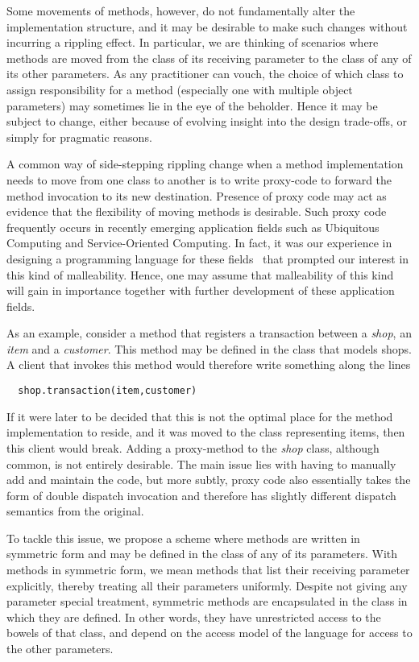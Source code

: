 \documentclass[11pt]{article}
\begin{document}
Some movements of methods, however, do not fundamentally alter the implementation structure, and it may be desirable to make such changes without incurring a rippling effect. In particular, we are thinking of scenarios where methods are moved from the class of its receiving parameter to the class of any of its other parameters. As any practitioner can vouch, the choice of which class to assign responsibility for a method (especially one with multiple object parameters) may sometimes lie in the eye of the beholder. Hence it may be subject to change, either because of evolving insight into the design trade-offs, or simply for pragmatic reasons. 

A common way of side-stepping rippling change when a method implementation needs to move from one class to another is to write proxy-code to forward the method invocation to its new destination. Presence of proxy code may act as evidence that the flexibility of moving methods is desirable. Such proxy code frequently occurs in recently emerging application fields such as Ubiquitous Computing and Service-Oriented Computing. In fact, it was our experience in designing a programming language for these fields~\cite{continuum} that prompted our interest in this kind of malleability. Hence, one may assume that malleability of this kind will gain in importance together with further development of these application fields.

As an example, consider a method that registers a transaction between a \emph{shop}, an \emph{item} and a \emph{customer}. This method may be defined in the class that models shops. A client that invokes this method would therefore write something along the lines
\begin{verbatim}
  shop.transaction(item,customer)
\end{verbatim}
If it were later to be decided that this is not the optimal place for the method implementation to reside, and it was moved to the class representing items, then this client would break. Adding a proxy-method to the \emph{shop} class, although common, is not entirely desirable. The main issue lies with having to manually add and maintain the code, but more subtly, proxy code also essentially takes the form of double dispatch invocation and therefore has slightly different dispatch semantics from the original.

To tackle this issue, we propose a scheme where methods are written in symmetric form and may be defined in the class of any of its parameters. With methods in symmetric form, we mean methods that list their receiving parameter explicitly, thereby treating all their parameters uniformly. Despite not giving any parameter special treatment, symmetric methods are encapsulated in the class in which they are defined. In other words, they have unrestricted access to the bowels of that class, and depend on the access model of the language for  access to the other parameters.
\end{document}
